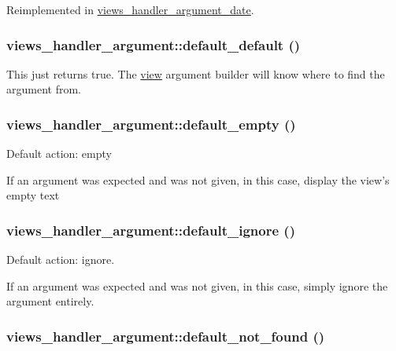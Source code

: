 Reimplemented in \hyperlink{classviews__handler__argument__date_9c6775f6c034bfcec9cd0fe0ab0e96f2}{views\_\-handler\_\-argument\_\-date}.\hypertarget{classviews__handler__argument_15f51f60c6183e6975d0aef857ad7f42}{
\subsubsection[{default\_\-default}]{\setlength{\rightskip}{0pt plus 5cm}views\_\-handler\_\-argument::default\_\-default ()}}
\label{classviews__handler__argument_15f51f60c6183e6975d0aef857ad7f42}


This just returns true. The \hyperlink{classview}{view} argument builder will know where to find the argument from. \hypertarget{classviews__handler__argument_0648192a05a597bd19ff2ba6e5bdaa91}{
\subsubsection[{default\_\-empty}]{\setlength{\rightskip}{0pt plus 5cm}views\_\-handler\_\-argument::default\_\-empty ()}}
\label{classviews__handler__argument_0648192a05a597bd19ff2ba6e5bdaa91}


Default action: empty

If an argument was expected and was not given, in this case, display the view's empty text \hypertarget{classviews__handler__argument_dd70e34213524feae0efaf05235ef60e}{
\subsubsection[{default\_\-ignore}]{\setlength{\rightskip}{0pt plus 5cm}views\_\-handler\_\-argument::default\_\-ignore ()}}
\label{classviews__handler__argument_dd70e34213524feae0efaf05235ef60e}


Default action: ignore.

If an argument was expected and was not given, in this case, simply ignore the argument entirely. \hypertarget{classviews__handler__argument_86d899382f0c2cb16177d18b553827af}{
\subsubsection[{default\_\-not\_\-found}]{\setlength{\rightskip}{0pt plus 5cm}views\_\-handler\_\-argument::default\_\-not\_\-found ()}}
\label{classviews__handler__argument_86d899382f0c2cb16177d18b553827af}


